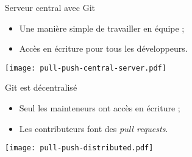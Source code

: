 \begin{frame}{Serveur central avec Git}
  \begin{itemize}
    \item Une manière simple de travailler en équipe ;
    \item Accès en écriture pour tous les développeurs.
  \end{itemize}

  \bigskip
  \begin{center}
    \texttt{[image: pull-push-central-server.pdf]}
  \end{center}
\end{frame}

\begin{frame}{Git est décentralisé}
  \begin{itemize}
    \item Seul les mainteneurs ont accès en écriture ;
    \item Les contributeurs font des \textit{pull requests}.
  \end{itemize}

  \bigskip
  \begin{center}
    \texttt{[image: pull-push-distributed.pdf]}
  \end{center}
\end{frame}
